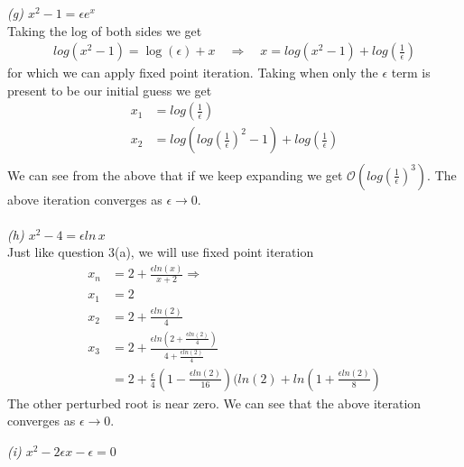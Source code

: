 \documentclass[12pt]{article}
\theoremstyle{remark}
\begin{document}
\newpage

\textit{(g) $x^2 - 1 = \epsilon e^x$} \\ 

Taking the log of both sides we get 
\begin{align*}
	log(x^2 - 1) = \log(\epsilon) + x \quad \Rightarrow \quad x = log(x^2 - 1) + log(\frac{1}{\epsilon})
\end{align*}
for which we can apply fixed point iteration. Taking when only the  $\epsilon$ term is present to be our initial guess we get
\begin{align*}
	x_1 & = log(\frac{1}{\epsilon}) \\
	x_2 & = log(log(\frac{1}{\epsilon})^2 - 1) + log(\frac{1}{\epsilon}) \\	
\end{align*}
We can see from the above that if we keep expanding we get $\mathcal{O}(log(\frac{1}{\epsilon})^3)$. The above iteration converges as $\epsilon \rightarrow 0$. \\ \\

\textit{(h) $x^2 - 4 = \epsilon ln\,x$} \\ 

Just like question 3(a), we will use fixed point iteration
\begin{align*}
	x_n & = 2 + \frac{\epsilon ln(x)}{x + 2} \Rightarrow \\
	x_1 & = 2 \\
	x_2 & = 2 + \frac{\epsilon ln(2)}{4} \\
	x_3 & = 2 + \frac{\epsilon ln(2 + \frac{\epsilon ln(2)}{4})}{4 + \frac{\epsilon ln(2)}{4}} \\
	& = 2 + \frac{\epsilon}{4}(1 - \frac{\epsilon ln(2)}{16})(ln(2) + ln(1 + \frac{\epsilon ln(2)}{8})
\end{align*}
The other perturbed root is near zero. We can see that the above iteration converges as $\epsilon \rightarrow 0$.

\newpage

\textit{(i) $x^2 - 2\epsilon x - \epsilon = 0$} \\
\end{document}
